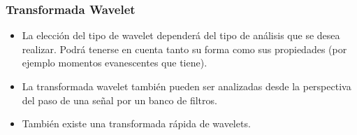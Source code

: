 \begin{frame}
\frametitle{Transformada Wavelet}

\begin{itemize}

\item La elecci\'{o}n del tipo de wavelet depender\'{a} del tipo de an\'{a}lisis que se desea realizar. Podr\'{a} tenerse en cuenta tanto su forma como sus propiedades (por ejemplo momentos evanescentes que tiene).

\item La transformada wavelet tambi\'{e}n pueden ser analizadas desde la perspectiva del paso de una se\~{n}al por un banco de filtros.

\item Tambi\'{e}n existe una transformada r\'{a}pida de wavelets.

\end{itemize}

\end{frame}
